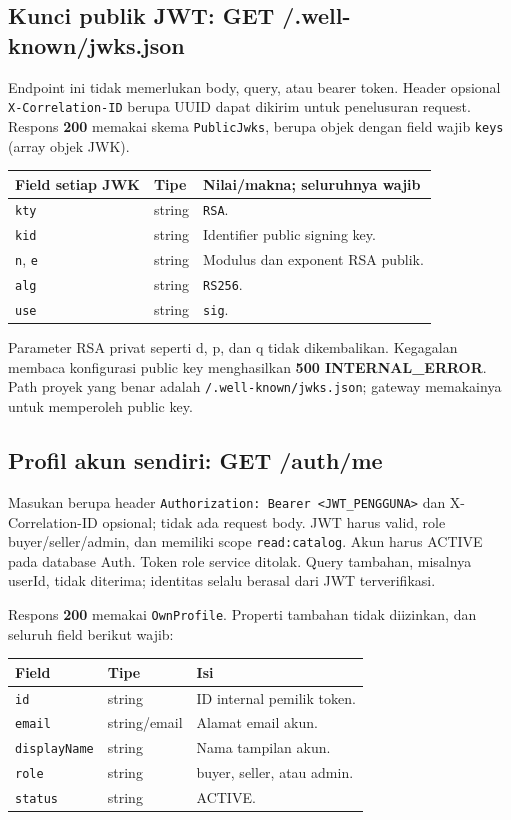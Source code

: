 \documentclass[12pt,a4paper]{article}
\newcommand{\code}[1]{{\small\nolinkurl{#1}}}
\begin{document}
\clearpage
\subsection{Kunci publik JWT: GET /.well-known/jwks.json}
Endpoint ini tidak memerlukan body, query, atau bearer token. Header opsional \code{X-Correlation-ID} berupa UUID dapat dikirim untuk penelusuran request. Respons \textbf{200} memakai skema \code{PublicJwks}, berupa objek dengan field wajib \code{keys} (array objek JWK).

\begin{small}
\begin{tabularx}{\linewidth}{@{}l l Y@{}}
\toprule Field setiap JWK & Tipe & Nilai/makna; seluruhnya wajib\\\midrule
\code{kty} & string & \code{RSA}.\\
\code{kid} & string & Identifier public signing key.\\
\code{n}, \code{e} & string & Modulus dan exponent RSA publik.\\
\code{alg} & string & \code{RS256}.\\
\code{use} & string & \code{sig}.\\
\bottomrule
\end{tabularx}
\end{small}

Parameter RSA privat seperti d, p, dan q tidak dikembalikan. Kegagalan membaca konfigurasi public key menghasilkan \textbf{500 INTERNAL\_ERROR}. Path proyek yang benar adalah \code{/.well-known/jwks.json}; gateway memakainya untuk memperoleh public key.

\subsection{Profil akun sendiri: GET /auth/me}
Masukan berupa header \code{Authorization: Bearer <JWT_PENGGUNA>} dan X-Correlation-ID opsional; tidak ada request body. JWT harus valid, role buyer/seller/admin, dan memiliki scope \code{read:catalog}. Akun harus ACTIVE pada database Auth. Token role service ditolak. Query tambahan, misalnya userId, tidak diterima; identitas selalu berasal dari JWT terverifikasi.

Respons \textbf{200} memakai \code{OwnProfile}. Properti tambahan tidak diizinkan, dan seluruh field berikut wajib:

\begin{small}
\begin{tabularx}{\linewidth}{@{}l l Y@{}}
\toprule Field & Tipe & Isi\\\midrule
\code{id} & string & ID internal pemilik token.\\
\code{email} & string/email & Alamat email akun.\\
\code{displayName} & string & Nama tampilan akun.\\
\code{role} & string & buyer, seller, atau admin.\\
\code{status} & string & ACTIVE.\\
\bottomrule
\end{tabularx}
\end{small}
\end{document}
